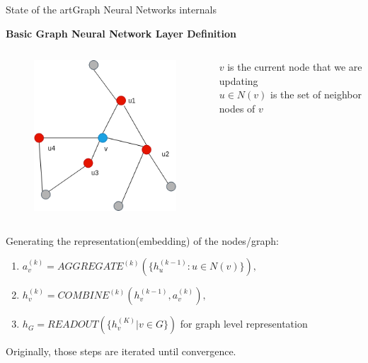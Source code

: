 \documentclass[xcolor=table]{beamer}
\begin{document}
\begin{frame}{State of the art}{Graph Neural Networks internals}

\textbf{Basic Graph Neural Network Layer Definition}

\begin{columns}
\begin{figure}
    \includegraphics[scale=0.35]{./img/GNN_internals_02.png}
\end{figure}


$ v $ is the current node that we are updating\\
$ u \in N(v)$ is the set of neighbor nodes of $v$\\


\end{columns}

\vspace{20px}
Generating the representation(embedding) of the nodes/graph:

\begin{enumerate}
    \item $ a_v^{(k)} = AGGREGATE^{(k)}(\{ h_u^{(k-1)} : u \in N(v) \}) ,$
    \item $ h_v^{(k)} = COMBINE^{(k)}(h_v^{(k-1)}, a_v^{(k)}),$
    \item $ h_G = READOUT(\{h_v^{(K)} | v \in G\})$  for graph level representation
\end{enumerate}
\vspace{20px}
Originally, those steps are iterated until convergence.
\end{frame}
\end{document}

